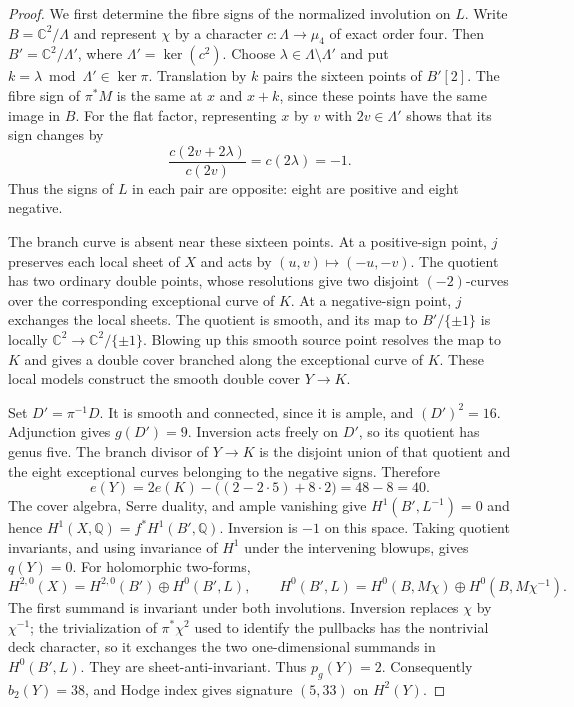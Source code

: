 \documentclass[11pt]{amsart}
\newcommand{\Q}{\mathbb Q}
\newcommand{\C}{\mathbb C}
\theoremstyle{definition}
\theoremstyle{remark}
\numberwithin{equation}{section}
\begin{document}
\begin{proof}
We first determine the fibre signs of the normalized involution on $L$.
Write $B=\C^2/\Lambda$ and represent $\chi$ by a character
$c:\Lambda\to\mu_4$ of exact order four.  Then
$B'=\C^2/\Lambda'$, where $\Lambda'=\ker(c^2)$.  Choose
$\lambda\in\Lambda\setminus\Lambda'$ and put
$k=\lambda\bmod\Lambda'\in\ker\pi$.  Translation by $k$ pairs the
sixteen points of $B'[2]$.  The fibre sign of $\pi^*M$ is the same at
$x$ and $x+k$, since these points have the same image in $B$.  For the
flat factor, representing $x$ by $v$ with $2v\in\Lambda'$ shows that
its sign changes by
\[
 \frac{c(2v+2\lambda)}{c(2v)}=c(2\lambda)=-1.
\]
Thus the signs of $L$ in each pair are opposite: eight are positive
and eight negative.

The branch curve is absent near these sixteen points.  At a
positive-sign point, $j$ preserves each local sheet of $X$ and acts
by $(u,v)\mapsto(-u,-v)$.  The quotient has two ordinary double
points, whose resolutions give two disjoint $(-2)$-curves over the
corresponding exceptional curve of $K$.  At a negative-sign point,
$j$ exchanges the local sheets.  The quotient is smooth, and its map
to $B'/\{\pm1\}$ is locally $\C^2\to\C^2/\{\pm1\}$.
Blowing up this smooth source point resolves the map to $K$ and gives
a double cover branched along the exceptional curve of $K$.  These
local models construct the smooth double cover $Y\to K$.

Set $D'=\pi^{-1}D$.  It is smooth and connected, since it is ample,
and $(D')^2=16$.  Adjunction gives $g(D')=9$.  Inversion acts freely
on $D'$, so its quotient has genus five.  The branch divisor of
$Y\to K$ is the disjoint union of that quotient and the eight
exceptional curves belonging to the negative signs.  Therefore
\[
 e(Y)=2e(K)-\bigl((2-2\cdot5)+8\cdot2\bigr)=48-8=40.
\]
The cover algebra, Serre duality, and ample vanishing give
$H^1(B',L^{-1})=0$ and hence $H^1(X,\Q)=f^*H^1(B',\Q)$.
Inversion is $-1$ on this space.  Taking quotient invariants, and
using invariance of $H^1$ under the intervening blowups, gives $q(Y)=0$.
For holomorphic two-forms,
\[
 H^{2,0}(X)=H^{2,0}(B')\oplus H^0(B',L),\qquad
 H^0(B',L)=H^0(B,M\chi)\oplus H^0(B,M\chi^{-1}).
\]
The first summand is invariant under both involutions. Inversion
replaces $\chi$ by $\chi^{-1}$; the trivialization of $\pi^*\chi^2$
used to identify the pullbacks has the nontrivial deck character, so it
exchanges the two one-dimensional summands in $H^0(B',L)$. They are
sheet-anti-invariant.  Thus $p_g(Y)=2$.  Consequently
$b_2(Y)=38$, and Hodge index gives signature $(5,33)$ on $H^2(Y)$.


\end{proof}
\end{document}
